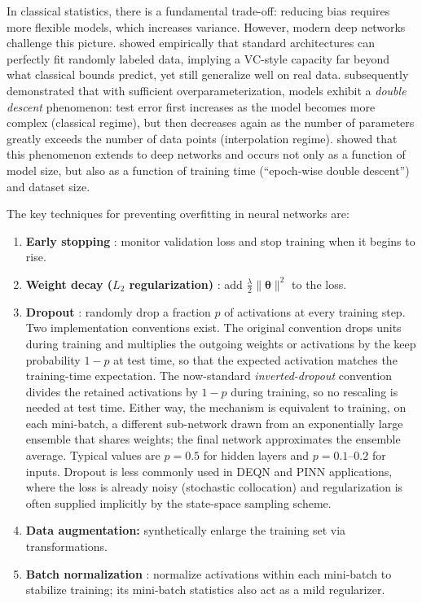\documentclass[11pt,a4paper]{report}
\begin{document}
In classical statistics, there is a fundamental trade-off: reducing bias requires more flexible models, which increases variance.  However, modern deep networks challenge this picture.  \citet{zhang2017understanding} showed empirically that standard architectures can perfectly fit randomly labeled data, implying a VC-style capacity far beyond what classical bounds predict, yet still generalize well on real data.  \citet{belkin2019reconciling} subsequently demonstrated that with sufficient overparameterization, models exhibit a \emph{double descent} phenomenon: test error first increases as the model becomes more complex (classical regime), but then decreases again as the number of parameters greatly exceeds the number of data points (interpolation regime).  \citet{nakkiran2020deep} showed that this phenomenon extends to deep networks and occurs not only as a function of model size, but also as a function of training time (``epoch-wise double descent'') and dataset size.

The key techniques for preventing overfitting in neural networks are:
\begin{enumerate}[itemsep=2pt]
\item \textbf{Early stopping} \citep{prechelt1998early}: monitor validation loss and stop training when it begins to rise.
\item \textbf{Weight decay ($L_2$ regularization)} \citep{krogh1991simple}: add $\frac{\lambda}{2}\|\bm{\theta}\|^2$ to the loss.
\item \textbf{Dropout} \citep{srivastava2014dropout}: randomly drop a fraction $p$ of activations at every training step.  Two implementation conventions exist.  The original convention drops units during training and multiplies the outgoing weights or activations by the keep probability $1-p$ at test time, so that the expected activation matches the training-time expectation.  The now-standard \emph{inverted-dropout} convention divides the retained activations by $1-p$ during training, so no rescaling is needed at test time.  Either way, the mechanism is equivalent to training, on each mini-batch, a different sub-network drawn from an exponentially large ensemble that shares weights; the final network approximates the ensemble average.  Typical values are $p=0.5$ for hidden layers and $p=0.1$--$0.2$ for inputs.  Dropout is less commonly used in DEQN and PINN applications, where the loss is already noisy (stochastic collocation) and regularization is often supplied implicitly by the state-space sampling scheme.
\item \textbf{Data augmentation:} synthetically enlarge the training set via transformations.
\item \textbf{Batch normalization} \citep{ioffe2015batch}: normalize activations within each mini-batch to stabilize training; its mini-batch statistics also act as a mild regularizer.
\end{enumerate}
\end{document}
